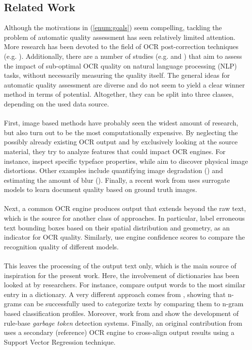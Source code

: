 \documentclass{jdmdh}
\begin{document}
\subsection{Related Work} \label{subsection:relatedwork}
Although the motivations in (\ref{enum:goals}) seem compelling, tackling the problem of automatic quality assessment has seen relatively limited attention. More research has been devoted to the field of OCR post-correction techniques (e.g. \citet{neudecker}). Additionally, there are a number of studies (e.g. \citet{strien} and \citet{hill}) that aim to assess the impact of sub-optimal OCR quality on natural language processing (NLP) tasks, without necessarily measuring the quality itself. The general ideas for automatic quality assessment are diverse and do not seem to yield a clear winner method in terms of potential. Altogether, they can be split into three classes, depending on the used data source.
\\ \\
First, image based methods have probably seen the widest amount of research, but also turn out to be the most computationally expensive. By neglecting the possibly already existing OCR output and by exclusively looking at the source material, they try to analyze features that could impact OCR engines. For instance, \citet{blando} inspect specific typeface properties, while \citet{lu} aim to discover physical image distortions. Other examples include quantifying image degradation (\citet{peng}) and estimating the amount of blur (\citet{kieu}). Finally, a recent work from \citet{singh} uses surrogate models to learn document quality based on ground truth images.
\\ \\
Next, a common OCR engine produces output that extends beyond the raw text, which is the source for another class of approaches. In particular, \citet{gupta} label erroneous text bounding boxes based on their spatial distribution and geometry, as an indicator for OCR quality. Similarly, \citet{springmann} use engine confidence scores to compare the recognition quality of different models.
\\ \\
This leaves the processing of the output text only, which is the main source of inspiration for the present work. Here, the involvement of dictionaries has been looked at by researchers. For instance, \citet{alex} compare output words to the most similar entry in a dictionary. A very different approach comes from \citet{cavnar}, showing that n-grams can be successfully used to categorize texts by comparing them to n-gram based classification profiles. Moreover, work from \citet{kulp} and \citet{taghva} show the development of rule-base \textit{garbage token} detection systems. Finally, an original contribution from \citet{salah} uses a secondary (reference) OCR engine to cross-align output results using a Support Vector Regression technique.
\end{document}
